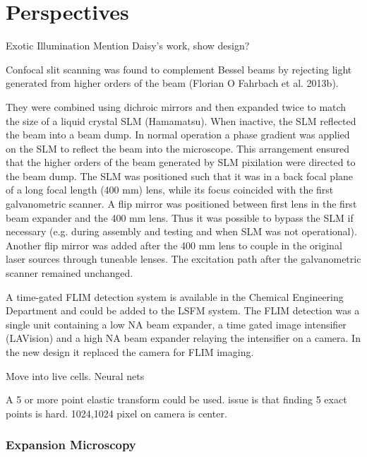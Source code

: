 \chapter{Perspectives}


Exotic Illumination
Mention Daisy's work, show design?

Confocal slit scanning was found to complement Bessel beams by rejecting light generated from higher orders of the beam (Florian O Fahrbach et al. 2013b).

They were combined using dichroic mirrors and then expanded twice to match the size of a liquid crystal SLM (Hamamatsu).
When inactive, the SLM reflected the beam into a beam dump.
In normal operation a phase gradient was applied on the SLM to reflect the beam into the microscope.
This arrangement ensured that the higher orders of the beam generated by SLM pixilation were directed to the beam dump.
The SLM was positioned such that it was in a back focal plane of a long focal length (400 mm) lens, while its focus coincided with the first galvanometric scanner.
A flip mirror was positioned between first lens in the first beam expander and the 400 mm lens.
Thus it was possible to bypass the SLM if necessary (e.g. during assembly and testing and when SLM was not operational).
Another flip mirror was added after the 400 mm lens to couple in the original laser sources through tuneable lenses.
 The excitation path after the galvanometric scanner remained unchanged.

A time-gated FLIM detection system is available in the Chemical Engineering Department and could be added to the LSFM system.
The FLIM detection was a single unit containing a low NA beam expander, a time gated image intensifier (LAVision) and a high NA beam expander relaying the intensifier on a camera.
In the new design it replaced the camera for FLIM imaging.



Move into live cells.
Neural nets


A 5 or more point elastic transform could be used.
issue is that finding 5 exact points is hard. 1024,1024 pixel on camera is center.

\subsection{Expansion Microscopy}

